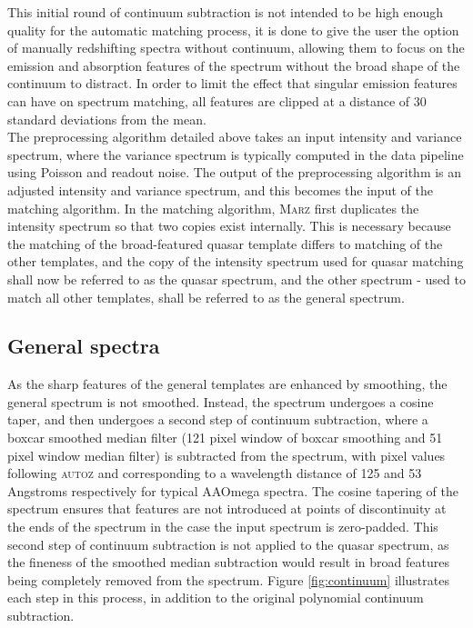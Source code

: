 \documentclass[5p]{elsarticle}
\newcommand{\autoz}{\textsc{autoz}}
\newcommand{\marz}{\textsc{Marz}}
\begin{document}
This initial round of continuum subtraction is not intended to be high enough quality for the automatic matching process, it is done to give the user the option of manually redshifting spectra without continuum, allowing them to focus on the emission and absorption features of the spectrum without the broad shape of the continuum to distract. In order to limit the effect that singular emission features can have on spectrum matching, all features are clipped at a distance of 30 standard deviations from the mean.\\







The preprocessing algorithm detailed above takes an input intensity and variance spectrum, where the variance spectrum is typically computed in the data pipeline using Poisson and readout noise. The output of the preprocessing algorithm is an adjusted intensity and variance spectrum, and this becomes the input of the matching algorithm. In the matching algorithm, \marz{} first duplicates the intensity spectrum so that two copies exist internally. This is necessary because the matching of the broad-featured quasar template differs to matching of the other templates, and the copy of the intensity spectrum used for quasar matching shall now be referred to as the quasar spectrum, and the other spectrum - used to match all other templates, shall be referred to as the general spectrum.

\subsection{General spectra}

As the sharp features of the general templates are enhanced by smoothing, the general spectrum is not smoothed. Instead, the spectrum undergoes a cosine taper, and then undergoes a second step of continuum subtraction, where a boxcar smoothed median filter (121 pixel window of boxcar smoothing and 51 pixel window median filter) is subtracted from the spectrum, with pixel values following \autoz{} and corresponding to a wavelength distance of 125 and 53 Angstroms respectively for typical AAOmega spectra. The cosine tapering of the spectrum ensures that features are not introduced at points of discontinuity at the ends of the spectrum in the case the input spectrum is zero-padded.  This second step of continuum subtraction is not applied to the quasar spectrum, as the fineness of the smoothed median subtraction would result in broad features being completely removed from the spectrum. Figure \ref{fig:continuum} illustrates each step in this process, in addition to the original polynomial continuum subtraction.
\end{document}
